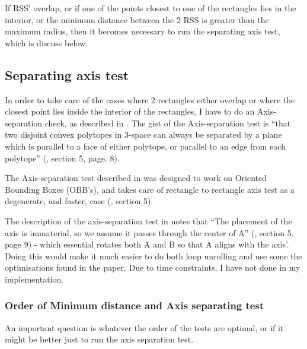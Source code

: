 If RSS' overlap, or if one of the points closest to one of the rectangles lies in the interior, or the minimum distance between the 2 RSS is greater than the maximum radius, then it becomes necessary to run the separating axis test, which is discuss below.

\subsection{Separating axis test}
\label{sepAxis}
In order to take care of the cases where 2 rectangles either overlap or where the closest point lies inside the interior of the rectangles, I have to do an Axis-separation check, as described in \cite{237244}. The gist of the Axis-separation test is ``that two disjoint convex polytopes in 3-space can always be separated by a plane which is parallel to a face of either polytope, or parallel to an edge from each polytope'' (\cite{237244}, section 5, page. 8).

The Axis-separation test described in \cite{237244} was designed to work on Oriented Bounding Boxes (OBB's), and takes care of rectangle to rectangle axis test as a degenerate, and faster, case (\cite{237244}, section 5). 

The description of the axis-separation test in \cite{237244} notes that ``The placement of the axis is immaterial, so we assume it passes through the center of A'' (\cite{237244}, section 5, page 9) - which essential rotates both A and B so that A aligns with the axis'. Doing this would make it much easier to do both loop unrolling  and use some the optimisations found in the paper. Due to time constraints, I have not done in my implementation.


\subsubsection{Order of Minimum distance and Axis separating test}
\label{minAxisOrder}
An important question is whatever the order of the tests are optimal, or if it might be better just to run the axis separation test.

